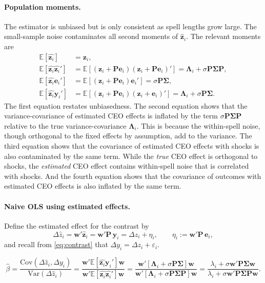 \documentclass[11pt,a4paper]{article}
\newcommand{\Var}{\text{Var}}
\newcommand{\Cov}{\text{Cov}}
\begin{document}
\paragraph{Population moments.}
The estimator is unbiased but is only consistent as spell lengths grow large. The small-sample noise contaminates all second moments of $\hat{\mathbf z}_i$. The relevant moments are
\begin{align}
  \mathbb E[\hat{\mathbf z_i}] &= \mathbf z_i,\\
  \mathbb E[\hat{\mathbf z_i}\hat{\mathbf z_i}'] &= 
\mathbb E[(\mathbf z_i + \mathbf P\mathbf e_i)(\mathbf z_i + \mathbf P\mathbf e_i)' ] =
    \mathbf \Lambda_i + \sigma\mathbf P\mathbf\Sigma\mathbf P,\\ 
  \mathbb E[\hat{\mathbf z_i}\mathbf e_i'] &= 
\mathbb E[(\mathbf z_i + \mathbf P\mathbf e_i)\mathbf e_i' ] = \sigma\mathbf P\mathbf\Sigma,\\
  \mathbb E[\hat{\mathbf z_i}\mathbf y_i'] &= 
\mathbb E[(\mathbf z_i + \mathbf P\mathbf e_i)(\mathbf z_i + \mathbf e_i)' ] = \mathbf \Lambda_i + \sigma\mathbf P\mathbf\Sigma.
\end{align}
The first equation restates unbiasedness. The second equation shows that the variance-covariance of estimated CEO effects is inflated by the term $\sigma\mathbf P\mathbf\Sigma\mathbf P$ relative to the true variance-covariance $\mathbf \Lambda_i$. This is because the within-spell noise, though orthogonal to the fixed effects by assumption, add to the variance. The third equation shows that the covariance of estimated CEO effects with shocks is also contaminated by the same term. While the \emph{true} CEO effect is orthogonal to shocks, the \emph{estimated} CEO effect contains within-spell noise that is correlated with shocks. And the fourth equation shows that the covariance of outcomes with estimated CEO effects is also inflated by the same term.

\paragraph{Naive OLS using estimated effects.} 
Define the estimated effect for the contrast by
$$
\Delta\hat z_i = \mathbf w'\hat{\mathbf z}_i = \mathbf w'\mathbf P\,\mathbf y_i = \Delta z_i + \eta_i,\qquad \eta_i:=\mathbf w'\mathbf P\,\mathbf e_i,
$$
and recall from \eqref{eq:contrast} that $\Delta y_i = \Delta z_i + \varepsilon_i$. 

\begin{equation}
\hat\beta = 
  \frac {\Cov(\Delta \hat z_i, \Delta y_i)}
        {\Var(\Delta \hat z_i)} =
  \frac {\mathbf w' \mathbb E[\hat{\mathbf z_i}\mathbf y_i ']\mathbf w}
        {\mathbf w' \mathbb E[\hat{\mathbf z_i}\hat{\mathbf z_i}']\mathbf w} =
  \frac {\mathbf w' [\mathbf \Lambda_i + \sigma \mathbf P\mathbf\Sigma]\mathbf w}
        {\mathbf w' [\mathbf \Lambda_i + \sigma \mathbf P\mathbf\Sigma\mathbf P]\mathbf w} =
  \frac {\lambda_i + \sigma \mathbf w' \mathbf P\mathbf\Sigma \mathbf w}
        {\lambda_i + \sigma \mathbf w' \mathbf P\mathbf\Sigma \mathbf P \mathbf w}. 
\end{equation}  
\end{document}
